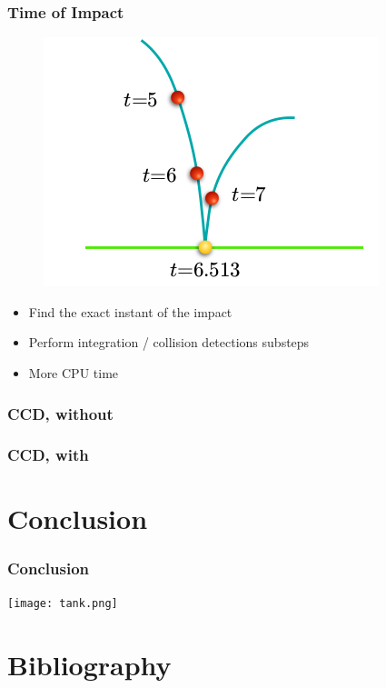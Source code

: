 \documentclass{beamer}
\begin{document}
\begin{frame}
  \frametitle{Time of Impact}

  \begin{figure}[p]
    \centering
    \includegraphics[width=0.5\linewidth]{ccd6}
  \end{figure}

  \begin{itemize}
  \item Find the exact instant of the impact
  \item Perform integration / collision detections substeps
  \item More CPU time
  \end{itemize}
  
\end{frame}

\begin{frame}
  \frametitle{CCD, without}
  \begin{centering}
  \end{centering}
\end{frame}

\begin{frame}
  \frametitle{CCD, with}
  \begin{centering}
  \end{centering}
\end{frame}

\section*{Conclusion}
\begin{frame}
\frametitle{Conclusion}
\texttt{[image: tank.png]}
\end{frame}

\section*{Bibliography}
\end{document}
